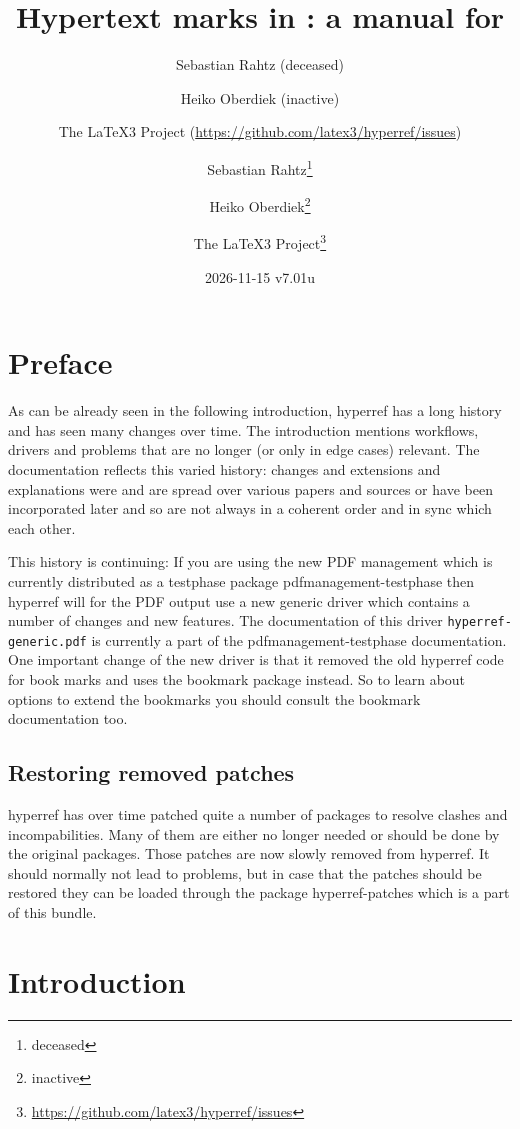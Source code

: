 \documentclass{article}
\author{Sebastian Rahtz (deceased)\and
       Heiko Oberdiek (inactive)\and
       The \LaTeX3 Project (\url{https://github.com/latex3/hyperref/issues})}
\author{Sebastian Rahtz\thanks{deceased}\and
       Heiko Oberdiek\thanks{inactive}\and
       The \LaTeX3 Project\thanks{\url{https://github.com/latex3/hyperref/issues}}}
\title{Hypertext marks in \hologo{LaTeX}: a manual for \xpackage{hyperref}}
\date{2026-11-15 v7.01u}
\newcommand*{\xpackage}[1]{\textsf{#1}}
\begin{document}
\thispagestyle{empty}
\maketitle
\tableofcontents
\setcounter{tocdepth}{2}%

\section{Preface}
As can be already seen in the following introduction, \xpackage{hyperref}
has a long history and has seen many changes over time. The introduction
mentions workflows, drivers and problems that are no longer (or only in edge cases) relevant.
The documentation reflects this varied history: changes
and extensions and explanations were and are spread over various papers and sources or
have been incorporated later and so are not always in a coherent order and in sync which each other.

This history is continuing: If you are using the new  PDF management
which is currently distributed as a testphase package \xpackage{pdfmanagement-testphase}
then \xpackage{hyperref} will for the PDF output use a new generic driver which
contains a number of changes and new features. The documentation of this driver
\texttt{hyperref-generic.pdf}
is currently a part of the \xpackage{pdfmanagement-testphase} documentation.
One important change of the new driver is
that it removed the old \xpackage{hyperref} code for book marks and uses
the \xpackage{bookmark} package instead. So to learn
about options to extend the bookmarks you should consult the \xpackage{bookmark} documentation
too.

\subsection{Restoring removed patches}

\xpackage{hyperref} has over time patched quite a number of packages to resolve clashes and incompabilities.
Many of them are either no longer needed or should be done by the original packages.
Those patches are now slowly removed from \xpackage{hyperref}.  It should normally not lead to problems, but
in case that the patches should be restored they can be loaded through the package \xpackage{hyperref-patches} which
is a part of this bundle.



\section{Introduction}
\end{document}
